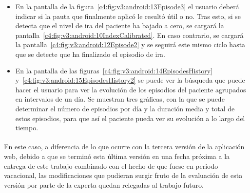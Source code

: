\begin{itemize}
   \item En la pantalla de la figura~\ref{c4:fig:v3:android:13Episode3} el usuario deberá indicar si la pauta que finalmente aplicó le resultó útil o no. Tras esto, si se detecta que el nivel de ira del paciente ha bajado a cero, se cargará la pantalla~\ref{c4:fig:v3:android:10IndexCalibrated}. En caso contrario, se cargará la pantalla~\ref{c4:fig:v3:android:12Episode2} y se seguirá este mismo ciclo hasta que se detecte que ha finalizado el episodio de ira.

   
   \item En la pantalla de las figuras~\ref{c4:fig:v3:android:14EpisodesHistory} y~\ref{c4:fig:v3:android:15EpisodesHistory2} se puede ver la búsqueda que puede hacer el usuario para ver la evolución de los episodios del paciente agrupados en intervalos de un día. Se muestran tres gráficas, con la que se puede determinar el número de episodios por día y la duración media y total de estos episodios, para que así el paciente pueda ver su evolución a lo largo del tiempo.
\end{itemize}

\paragraph{}
En este caso, a diferencia de lo que ocurre con la tercera versión de la aplicación web, debido a que se terminó esta última versión en una fecha próxima a la entrega de este trabajo combinado con el hecho de que fuese en periodo vacacional, las modificaciones que pudieran surgir fruto de la evaluación de esta versión por parte de la experta quedan relegadas al trabajo futuro.












